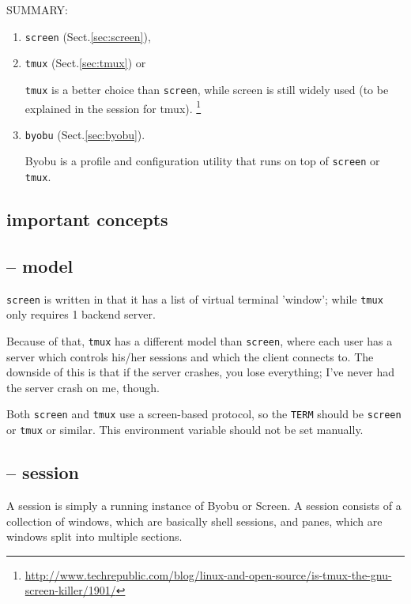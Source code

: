 SUMMARY:
\begin{enumerate}
  \item  \verb!screen! (Sect.\ref{sec:screen}), 
  
  \item \verb!tmux! (Sect.\ref{sec:tmux}) or 

\verb!tmux! is a better choice than \verb!screen!, while screen is still widely
used (to be explained in the session for tmux).
\footnote{\url{http://www.techrepublic.com/blog/linux-and-open-source/is-tmux-the-gnu-screen-killer/1901/}}
  
  \item  \verb!byobu! (Sect.\ref{sec:byobu}).

Byobu is a profile and configuration utility that runs on top of \verb!screen!
or \verb!tmux!. 

\end{enumerate}


\subsection{important concepts}

\subsection{-- model}

\verb!screen! is written in that it has a list of virtual terminal 'window';
while \verb!tmux! only requires 1 backend server.

Because of that, \verb!tmux! has a different model than \verb!screen!, where
each user has a server which controls his/her sessions and which the client
connects to. The downside of this is that if the server crashes, you lose
everything; I've never had the server crash on me, though.

Both \verb!screen! and \verb!tmux! use a screen-based protocol, so the
\verb!TERM! should be \verb!screen! or \verb!tmux! or similar. This environment
variable should not be set manually.


\subsection{-- session}
\label{sec:terminal_multiplexer-session}

A session is simply a running instance of Byobu or Screen.
A session consists of a collection of windows, which are basically shell
sessions, and panes, which are windows split into multiple sections.


